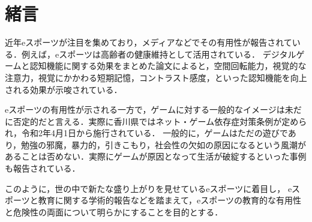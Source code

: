 \section{緒言}

近年eスポーツが注目を集めており，メディアなどでその有用性が報告されている．例えば，eスポーツは高齢者の健康維持として活用されている．%
デジタルゲームと認知機能に関する効果をまとめた論文\cite{玉宮2016}によると，空間回転能力，視覚的な注意力，視覚にかかわる短期記憶，コントラスト感度，といった認知機能を向上される効果が示唆されている．

eスポーツの有用性が示される一方で，ゲームに対する一般的なイメージは未だに否定的だと言える．実際に香川県ではネット・ゲーム依存症対策条例が定められ，令和2年4月1日から施行されている．%
一般的に，ゲームはただの遊びであり，勉強の邪魔，暴力的，引きこもり，社会性の欠如の原因になるという風潮があることは否めない．実際にゲームが原因となって生活が破綻するといった事例も報告されている．

このように，世の中で新たな盛り上がりを見せているeスポーツに着目し，%
eスポーツと教育に関する学術的報告などを踏まえて，eスポーツの教育的な有用性と危険性の両面について明らかにすることを目的とする．

